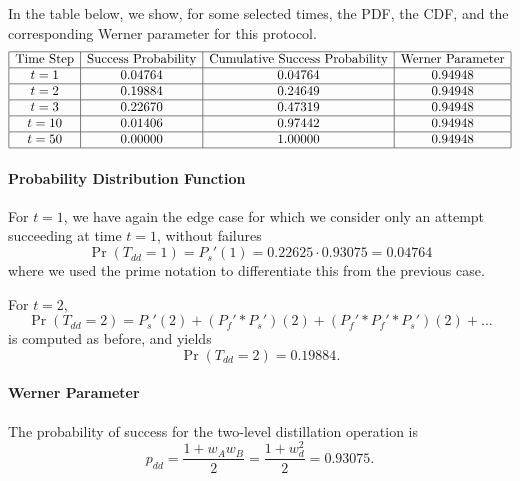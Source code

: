 \documentclass{masterthesis}
\begin{document}
In the table below, we show, for some selected times, the PDF, the CDF, and the corresponding Werner parameter for this protocol.
\begin{equation*}
    \begin{array}{|c|c|c|c|}
        \hline
        \text{Time Step} & \text{Success Probability} & \text{Cumulative Success Probability} & \text{Werner Parameter} \\
        \hline
        t = 1 & 0.04764 & 0.04764 & 0.94948 \\
        \hline
        t = 2 & 0.19884 & 0.24649 & 0.94948 \\
        \hline
        t = 3 & 0.22670 & 0.47319 & 0.94948 \\
        \hline
        t = 10 & 0.01406 & 0.97442 & 0.94948 \\
        \hline
        t = 50 & 0.00000 & 1.00000 & 0.94948 \\
        \hline
    \end{array}
\end{equation*}

\paragraph*{Probability Distribution Function}

For $t = 1$, we have again the edge case for which we consider only an attempt succeeding at time $t=1$, without failures  
\begin{equation}
    \Pr(T_{dd} = 1) = P_s'(1) = 0.22625 \cdot 0.93075 = 0.04764 
\end{equation}
where we used the prime notation to differentiate this from the previous case. 

For $t = 2$,
\begin{equation}
    \Pr(T_{dd} = 2) = P_s'(2) + (P_f' \ast P_s')(2) + (P_f' \ast P_f' \ast P_s')(2) + \ldots
\end{equation}
is computed as before, and yields
\begin{equation}
    \Pr(T_{dd} = 2) = 0.19884 .
\end{equation}

\paragraph*{Werner Parameter}

The probability of success for the two-level distillation operation is
\begin{equation}
    p_{dd} = \frac{1 + w_A w_B}{2} = \frac{1 + w_d^2}{2} = 0.93075 .
\end{equation}
\end{document}
